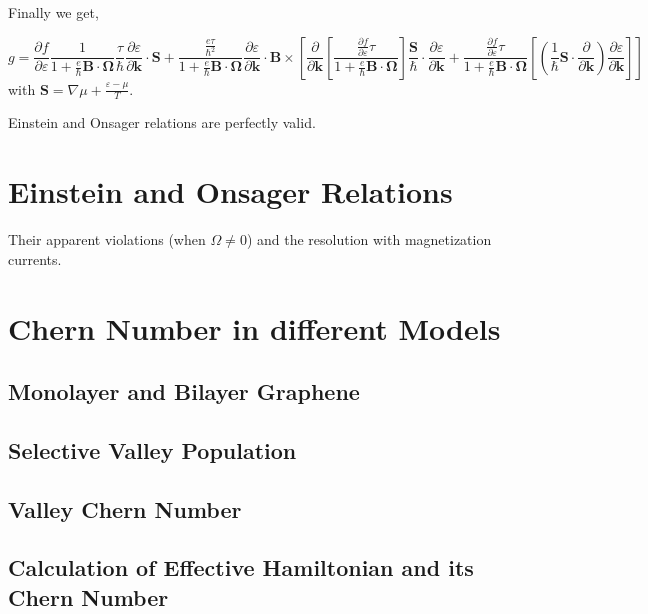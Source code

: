 \documentclass[aps,pra,amsmath,amssymb,floatfix,twocolumn, amsmath, superscriptaddress, twocolumn]{revtex4-2}
\newcommand{\bvec}[1]{{\mathbf #1}}
\begin{document}
Finally we get,

\begin{equation}
g = \frac{\partial f} {\partial \varepsilon}\frac{1}{1 + \frac{e}{\hbar} \bvec{B}\cdot\bvec{\Omega}}
\frac{\tau}{\hbar} \frac{\partial \varepsilon}{\partial \bvec{k}}\cdot  \bvec{S} + \frac{\frac{e \tau}{\hbar^2} }{1 + \frac{e}{\hbar} \bvec{B}\cdot\bvec{\Omega}} \frac{\partial \varepsilon}{\partial \bvec{k}} \cdot \bvec{B} \times \left[ \frac{\partial}{\partial \bvec{k}} \left[ \frac{\frac{\partial f} {\partial \varepsilon} \tau}{1 + \frac{e}{\hbar} \bvec{B}\cdot\bvec{\Omega}}
\right] \frac{\bvec{S}}{\hbar} \cdot \frac{\partial \varepsilon}{\partial \bvec{k}} + \frac{\frac{\partial f} {\partial \varepsilon} \tau}{1 + \frac{e}{\hbar} \bvec{B}\cdot\bvec{\Omega}} \left[(\frac{1}{\hbar} \bvec{S}\cdot \frac{\partial }{\partial \bvec{k}} )\frac{\partial \varepsilon}{\partial \bvec{k}} \right] \right]
\end{equation}\label{Eq:g_non_zero_chem_temp_grad}
with $\bvec{S} = \nabla \mu + \frac{\varepsilon - \mu}{T}$.

Einstein and Onsager relations are perfectly valid.

\section{Einstein and Onsager Relations}
Their apparent violations (when $\Omega \neq 0$) and the resolution with magnetization currents.

\section{Chern Number in different Models}
\subsection{Monolayer and Bilayer Graphene}
\subsection{Selective Valley Population}
\subsection{Valley Chern Number}
\subsection{Calculation of Effective Hamiltonian and its Chern Number}
\end{document}
